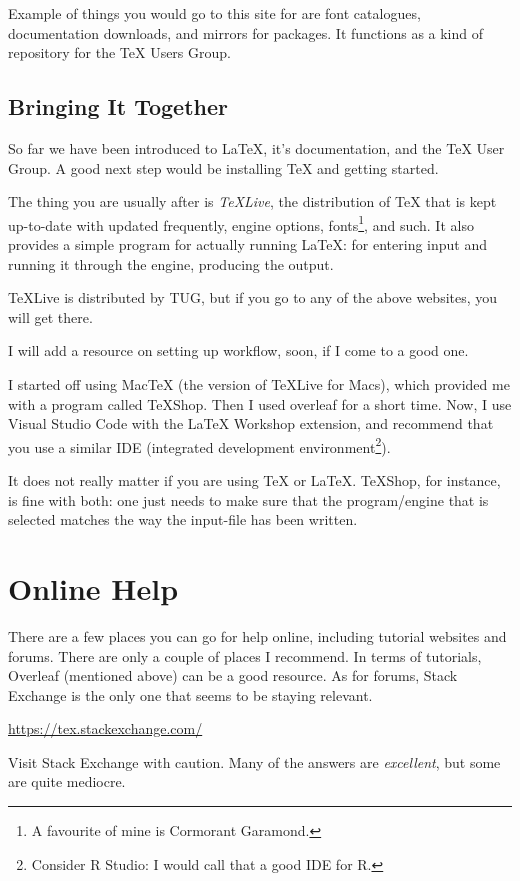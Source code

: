 \documentclass[11pt, oneside]{memoir}
\begin{document}
Example of things you would go to this site for are font catalogues, documentation downloads, and mirrors for packages. It functions as a kind of repository for the TeX Users Group.

\section{Bringing It Together}

So far we have been introduced to LaTeX, it's documentation, and the TeX User Group. A good next step would be installing TeX and getting started.

The thing you are usually after is \emph{TeXLive}, the distribution of TeX that is kept up-to-date with updated frequently, engine options, fonts\footnote{A favourite of mine is Cormorant Garamond.}, and such. It also provides a simple program for actually running LaTeX: for entering input and running it through the engine, producing the output.

TeXLive is distributed by TUG, but if you go to any of the above websites, you will get there.

I will add a resource on setting up workflow, soon, if I come to a good one.

I started off using MacTeX (the version of TeXLive for Macs), which provided me with a program called TeXShop. Then I used overleaf for a short time. Now, I use Visual Studio Code with the LaTeX Workshop extension, and recommend that you use a similar IDE (integrated development environment\footnote{Consider R Studio: I would call that a good IDE for R.}).

It does not really matter if you are using TeX or LaTeX. TeXShop, for instance, is fine with both: one just needs to make sure that the program/engine that is selected matches the way the input-file has been written.

\chapter{Online Help}

There are a few places you can go for help online, including tutorial websites and forums. There are only a couple of places I recommend. In terms of tutorials, Overleaf (mentioned above) can be a good resource. As for forums, Stack Exchange is the only one that seems to be staying relevant.

\url{https://tex.stackexchange.com/}

Visit Stack Exchange with caution. Many of the answers are \emph{excellent}, but some are quite mediocre.
\end{document}
